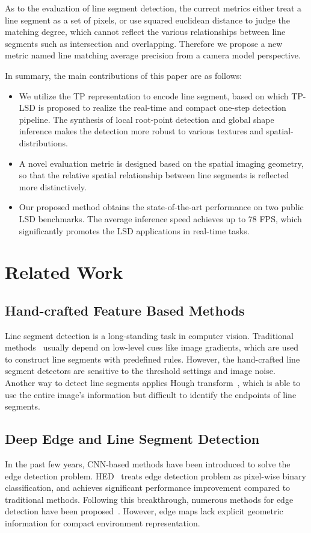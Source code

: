 \documentclass[runningheads]{llncs}
\begin{document}
As to the evaluation of line segment detection, the current metrics either treat a line segment as a set of pixels, or use squared euclidean distance to judge the matching degree, which cannot reflect the various relationships between line segments such as intersection and overlapping. Therefore we propose a new metric named line matching average precision from a camera model perspective.

In summary, the main contributions of this paper are as follows:
\begin{itemize}
    \item We utilize the TP representation to encode line segment, based on which TP-LSD is proposed to realize the real-time and compact one-step detection pipeline. The synthesis of local root-point detection and global shape inference makes the detection more robust to various textures and spatial-distributions.
    \item A novel evaluation metric is designed based on the spatial imaging geometry, so that the relative spatial relationship between line segments is reflected more distinctively.
    \item Our proposed method obtains the state-of-the-art performance on two public LSD benchmarks. The average inference speed achieves up to 78 FPS, which significantly promotes the LSD applications in real-time tasks.
\end{itemize}



\section{Related Work}
\subsection{Hand-crafted Feature Based Methods}
Line segment detection is a long-standing task in computer vision. Traditional methods~\cite{EDLines, linelet, LSD, CannyLines} usually depend on low-level cues like image gradients, which are used to construct line segments with predefined rules. 
However, the hand-crafted line segment detectors are sensitive to the threshold settings and image noise. Another way to detect line segments applies Hough transform~\cite{HoughT}, which is able to use the entire image's information but difficult to identify the endpoints of line segments.

\subsection{Deep Edge and Line Segment Detection}
In the past few years, CNN-based methods have been introduced to solve the edge detection problem. HED~\cite{HED} treats edge detection problem as pixel-wise binary classification,
and achieves significant performance improvement compared to traditional methods. Following this breakthrough, numerous methods for edge detection have been proposed~\cite{RCF, BASNet}. However, edge maps lack explicit geometric information for compact environment representation. 
\end{document}
